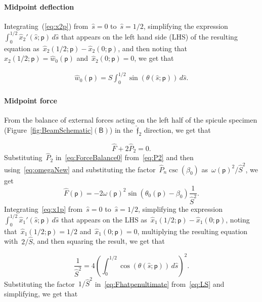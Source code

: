 \documentclass[preprint,10pt,times]{elsarticle}
\numberwithin{equation}{section}
\newcommand{\physf}{\hat{\boldsymbol{\mathfrak{f}}}}
\newcommand{\pr}[1]{\left( #1 \right)}
\newcommand{\subf}[1]{\pr{\textsf{#1}}}
\newcommand{\idp}{\mathsf{p}}
\begin{document}
\paragraph{Midpoint deflection}

Integrating~(\ref{eq:x2p}) from~$\hat{s}=0$ to~$\hat{s} = 1/2$,
simplifying the expression~$\int_{0}^{1/2}\hat{x}_{2}'(\hat{s};\idp)\, d\hat{s}$
that appears on the left hand side (LHS) of the resulting equation as~$\hat{x}_{2}(1/2;\idp)-\hat{x}_{2}(0;\idp)$,
and then noting that~$\hat{x}_{2}(1/2;\idp)=\hat{w}_0(\idp)$ and~$\hat{x}_{2}(0;\idp)=0$,
we get that

\begin{align}
\hat{w}_0\pr{\idp}=\hat{S}\int_{0}^{1/2}\sin\pr{\theta\pr{\hat{s};\idp}}\, d\hat{s}.
\label{eq:w0hat}
\end{align}

\paragraph{Midpoint force}

From the balance of external forces acting on the left half of the
spicule specimen (Figure~\ref{fig:BeamSchematic}$\subf{B}$) in
the~$\physf_2$ direction, we get that

\begin{equation}
\hat{F}+2\hat{P}_{2}=0.
\label{eq:ForceBalance0}
\end{equation}Substituting~$\hat{P}_2$ in~\eqref{eq:ForceBalance0} from~\eqref{eq:P2}
and then using~\eqref{eq:omegaNew} and substituting the factor~$\hat{P}_n\csc\pr{\beta_0}$
as~$\omega(\idp)^2/\hat{S}^{2}$, we get\begin{equation}
\hat{F}(\idp)=-2\omega(\idp)^2\sin\pr{\theta_0(\idp)-\beta_0}\frac{1}{\hat{S}^2}.
\label{eq:Fhatpenultimate}
\end{equation} Integrating~\eqref{eq:x1p} from~$\hat{s}=0$ to~$\hat{s} = 1/2$,
simplifying the expression~$\int_{0}^{1/2}\hat{x}_{1}'(\hat{s};\idp)\, d\hat{s}$
that appears on the LHS as~$\hat{x}_{1}(1/2;\idp)-\hat{x}_{1}(0;\idp)$,
noting that~$\hat{x}_{1}(1/2;\idp)=1/2$ and~$\hat{x}_{1}(0;\idp)=0$,
multiplying the resulting equation with~$2/\hat{S}$, and then squaring
the result, we get that

\begin{equation}
\frac{1}{\hat{S}^2}=4\pr{\int_{0}^{1/2}\cos\pr{\theta\pr{\hat{s};\idp}}\, d\hat{s}}^{2}.
\label{eq:LS}
\end{equation}
Substituting the factor~$1/\hat{S}^2$ in~\eqref{eq:Fhatpenultimate}
from~\eqref{eq:LS} and simplifying, we get that
\end{document}
